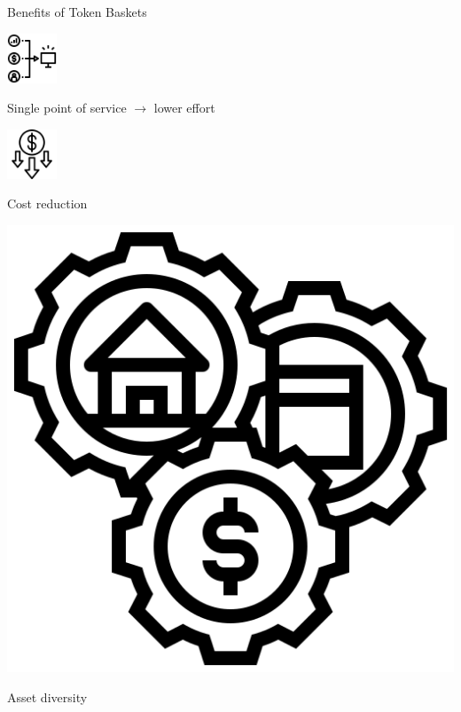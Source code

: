 \documentclass[handout]{beamer}
\begin{document}
\begin{frame}{Benefits of Token Baskets}
\vspace{2 em}

\begin{minipage}{0.2\textwidth}
			\begin{center}
				\includegraphics[height=4em]{../assets/images/pos.png}
			\end{center}
		\end{minipage}
		\hspace{1 em}
		\begin{minipage}{0.72\textwidth}
		Single point of service $\rightarrow$ lower effort
		\end{minipage}
		\pause
		\vspace{2 em}
		
		\begin{minipage}{0.2\textwidth}
			\begin{center}
				\includegraphics[height=4em]{../assets/images/money-loss.png}
			\end{center}
		\end{minipage}
		\hspace{1 em}
		\begin{minipage}{0.72\textwidth}
		Cost reduction
		\end{minipage}
		\pause
		\vspace{2 em}
		
		
		\begin{minipage}{0.2\textwidth}
			\begin{center}
				\includegraphics[height=4
				em]{../assets/images/assets.png}
			\end{center}
		\end{minipage}
		\hspace{1 em}
		\begin{minipage}{0.72\textwidth}
		Asset diversity
		\end{minipage}
		\pause
		\vspace{2 em}



\end{frame}
\end{document}

